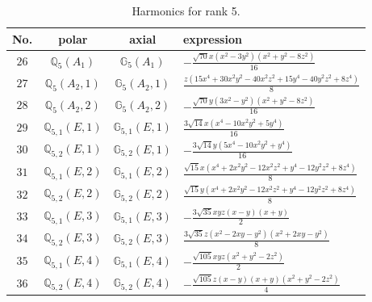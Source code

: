 \documentclass[fleqn,8pt,landscape]{jsarticle}
\begin{document}
\begin{table}[ht!]
\begin{center}
\caption{Harmonics for rank 5.}
\renewcommand{\arraystretch}{1.3}
\begin{tabular}{cccl} \hline \hline
No. & polar & axial & expression \\ \hline
$ 26 $ & $ \mathbb{Q}_{5}(A_{1}) $ & $ \mathbb{G}_{5}(A_{1}) $ & $ - \frac{\sqrt{70} x \left(x^{2} - 3 y^{2}\right) \left(x^{2} + y^{2} - 8 z^{2}\right)}{16} $ \\
$ 27 $ & $ \mathbb{Q}_{5}(A_{2},1) $ & $ \mathbb{G}_{5}(A_{2},1) $ & $ \frac{z \left(15 x^{4} + 30 x^{2} y^{2} - 40 x^{2} z^{2} + 15 y^{4} - 40 y^{2} z^{2} + 8 z^{4}\right)}{8} $ \\
$ 28 $ & $ \mathbb{Q}_{5}(A_{2},2) $ & $ \mathbb{G}_{5}(A_{2},2) $ & $ - \frac{\sqrt{70} y \left(3 x^{2} - y^{2}\right) \left(x^{2} + y^{2} - 8 z^{2}\right)}{16} $ \\
$ 29 $ & $ \mathbb{Q}_{5,1}(E,1) $ & $ \mathbb{G}_{5,1}(E,1) $ & $ \frac{3 \sqrt{14} x \left(x^{4} - 10 x^{2} y^{2} + 5 y^{4}\right)}{16} $ \\
$ 30 $ & $ \mathbb{Q}_{5,2}(E,1) $ & $ \mathbb{G}_{5,2}(E,1) $ & $ - \frac{3 \sqrt{14} y \left(5 x^{4} - 10 x^{2} y^{2} + y^{4}\right)}{16} $ \\
$ 31 $ & $ \mathbb{Q}_{5,1}(E,2) $ & $ \mathbb{G}_{5,1}(E,2) $ & $ \frac{\sqrt{15} x \left(x^{4} + 2 x^{2} y^{2} - 12 x^{2} z^{2} + y^{4} - 12 y^{2} z^{2} + 8 z^{4}\right)}{8} $ \\
$ 32 $ & $ \mathbb{Q}_{5,2}(E,2) $ & $ \mathbb{G}_{5,2}(E,2) $ & $ \frac{\sqrt{15} y \left(x^{4} + 2 x^{2} y^{2} - 12 x^{2} z^{2} + y^{4} - 12 y^{2} z^{2} + 8 z^{4}\right)}{8} $ \\
$ 33 $ & $ \mathbb{Q}_{5,1}(E,3) $ & $ \mathbb{G}_{5,1}(E,3) $ & $ - \frac{3 \sqrt{35} x y z \left(x - y\right) \left(x + y\right)}{2} $ \\
$ 34 $ & $ \mathbb{Q}_{5,2}(E,3) $ & $ \mathbb{G}_{5,2}(E,3) $ & $ \frac{3 \sqrt{35} z \left(x^{2} - 2 x y - y^{2}\right) \left(x^{2} + 2 x y - y^{2}\right)}{8} $ \\
$ 35 $ & $ \mathbb{Q}_{5,1}(E,4) $ & $ \mathbb{G}_{5,1}(E,4) $ & $ - \frac{\sqrt{105} x y z \left(x^{2} + y^{2} - 2 z^{2}\right)}{2} $ \\
$ 36 $ & $ \mathbb{Q}_{5,2}(E,4) $ & $ \mathbb{G}_{5,2}(E,4) $ & $ - \frac{\sqrt{105} z \left(x - y\right) \left(x + y\right) \left(x^{2} + y^{2} - 2 z^{2}\right)}{4} $ \\
 \hline \hline
\end{tabular}
\end{center}
\end{table}
\end{document}
